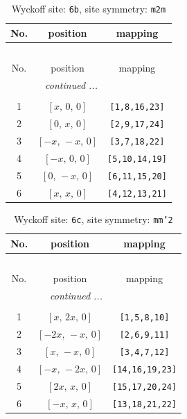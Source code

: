\documentclass[fleqn,8pt]{jsarticle}
\begin{document}
\begin{longtable}{ccc}
\caption{Wyckoff site: {\tt 6b}, site symmetry: {\tt m2m}}
 \\
 \hline \hline
No. & position & mapping \\ \hline \endfirsthead

\multicolumn{2}{l}{\tablename\ \thetable{}} \\
 \hline \hline
No. & position & mapping \\ \hline \endhead

 \hline \hline
\multicolumn{2}{r}{\footnotesize\it continued ...} \\ \endfoot

 \hline \hline
\multicolumn{2}{r}{} \\ \endlastfoot

1 & $\left[ x,\, 0,\, 0 \right]$ & {\tt [1,8,16,23]} \\ \hline
2 & $\left[ 0,\, x,\, 0 \right]$ & {\tt [2,9,17,24]} \\ \hline
3 & $\left[ - x,\, - x,\, 0 \right]$ & {\tt [3,7,18,22]} \\ \hline
4 & $\left[ - x,\, 0,\, 0 \right]$ & {\tt [5,10,14,19]} \\ \hline
5 & $\left[ 0,\, - x,\, 0 \right]$ & {\tt [6,11,15,20]} \\ \hline
6 & $\left[ x,\, x,\, 0 \right]$ & {\tt [4,12,13,21]} \\
\end{longtable}
\renewcommand{\arraystretch}{1.2}
\begin{longtable}{ccc}
\caption{Wyckoff site: {\tt 6c}, site symmetry: {\tt mm'2}}
 \\
 \hline \hline
No. & position & mapping \\ \hline \endfirsthead

\multicolumn{2}{l}{\tablename\ \thetable{}} \\
 \hline \hline
No. & position & mapping \\ \hline \endhead

 \hline \hline
\multicolumn{2}{r}{\footnotesize\it continued ...} \\ \endfoot

 \hline \hline
\multicolumn{2}{r}{} \\ \endlastfoot

1 & $\left[ x,\, 2 x,\, 0 \right]$ & {\tt [1,5,8,10]} \\ \hline
2 & $\left[ - 2 x,\, - x,\, 0 \right]$ & {\tt [2,6,9,11]} \\ \hline
3 & $\left[ x,\, - x,\, 0 \right]$ & {\tt [3,4,7,12]} \\ \hline
4 & $\left[ - x,\, - 2 x,\, 0 \right]$ & {\tt [14,16,19,23]} \\ \hline
5 & $\left[ 2 x,\, x,\, 0 \right]$ & {\tt [15,17,20,24]} \\ \hline
6 & $\left[ - x,\, x,\, 0 \right]$ & {\tt [13,18,21,22]} \\
\end{longtable}
\end{document}
